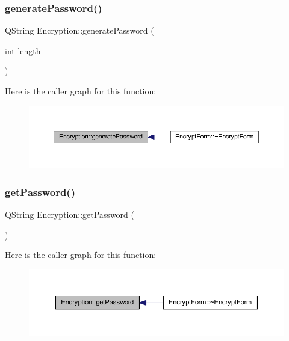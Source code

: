 \subsubsection{\texorpdfstring{generate\+Password()}{generatePassword()}}
{\footnotesize\ttfamily Q\+String Encryption\+::generate\+Password (\begin{DoxyParamCaption}\item[{int}]{length }\end{DoxyParamCaption})}

Here is the caller graph for this function\+:
\nopagebreak
\begin{figure}[H]
\begin{center}
\leavevmode
\includegraphics[width=350pt]{class_encryption_a4e2cab5c9d5349f085d40c8373b1985b_icgraph}
\end{center}
\end{figure}
\hypertarget{class_encryption_a55e34ee5668779c478f5771d24c2b183}{}\label{class_encryption_a55e34ee5668779c478f5771d24c2b183} 
\subsubsection{\texorpdfstring{get\+Password()}{getPassword()}}
{\footnotesize\ttfamily Q\+String Encryption\+::get\+Password (\begin{DoxyParamCaption}{ }\end{DoxyParamCaption})}

Here is the caller graph for this function\+:
\nopagebreak
\begin{figure}[H]
\begin{center}
\leavevmode
\includegraphics[width=350pt]{class_encryption_a55e34ee5668779c478f5771d24c2b183_icgraph}
\end{center}
\end{figure}
\hypertarget{class_encryption_af133b980f6daf0548a7097623ed35b10}{}\label{class_encryption_af133b980f6daf0548a7097623ed35b10} 
